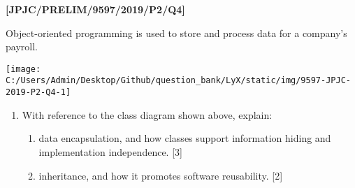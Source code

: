 \item \textbf{{[}JPJC/PRELIM/9597/2019/P2/Q4{]} }

Object-oriented programming is used to store and process data for
a company\textquoteright s payroll. 
\begin{center}
\texttt{[image: C:/Users/Admin/Desktop/Github/question\_bank/LyX/static/img/9597-JPJC-2019-P2-Q4-1]}
\par\end{center}
\begin{enumerate}
\item With reference to the class diagram shown above, explain: 
\begin{enumerate}
\item data encapsulation, and how classes support information hiding and
implementation independence. \hfill{}{[}3{]}
\item inheritance, and how it promotes software reusability. \hfill{}{[}2{]}
\end{enumerate}
\end{enumerate}
